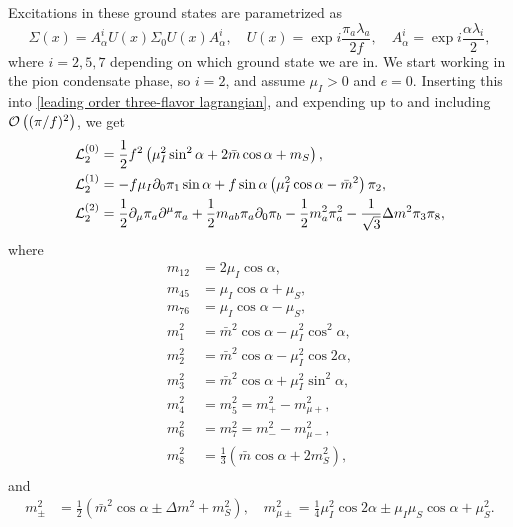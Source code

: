 Excitations in these ground states are parametrized as
%
\begin{equation}
    \Sigma(x) = A^i_\alpha U(x) \Sigma_0 U(x) A^i_\alpha, \quad
    U(x) = \exp{i \frac{\pi_a \lambda_a}{2 f}}, \quad
    A_\alpha^i = \exp{i \frac{\alpha \lambda_i}{2}},
\end{equation}
%
where $i = 2, 5, 7$ depending on which ground state we are in.
We start working in the pion condensate phase, so $i = 2$, and assume $\mu_I > 0$ and $e = 0$.
Inserting this into \autoref{leading order three-flavor lagrangian}, and expending up to and including $\mathcal O\left((\pi/f)^2\right)$, we get
%
\begin{align}
    \label{static three-flavor lagrangian}
    \mathcal{L}_2^{(0)} 
    &=
    \frac{1}{2} f^2
    \left(
        \mu_I^2 \sin^2\alpha
        + 2\bar m \cos\alpha
        + m_S
    \right), \\
    \label{linear three-flavor lagrangian}
    \mathcal{L}_2^{(1)}
    &=
    -f \mu_I \partial_0 \pi_1 \sin\alpha
    + f \sin\alpha
    \left(
        \mu_I^2\cos\alpha - \bar m^2
    \right)\pi_2, \\
    \label{quadratic three-flavor lagrangian}
    \mathcal{L}_2^{(2)} 
    &= 
    \frac{1}{2}\partial_\mu \pi_a \partial^\mu \pi_a
    + \frac{1}{2} m_{ab} \pi_a\partial_0\pi_b
    - \frac{1}{2} m_a^2 \pi_a^2
    - \frac{1}{\sqrt{3}} \Delta m^2 \pi_3 \pi_8,
\end{align}
%
where
%
\begingroup
\allowdisplaybreaks
\begin{align}
    m_{12} & = 2 \mu_I\cos\alpha,\\
    m_{45} & =\mu_I\cos\alpha + \mu_S, \\
    m_{76} & = \mu_I\cos\alpha - \mu_S, \\
    m_1^2 &=  \bar m^2\cos\alpha - \mu_I^2 \cos^2\alpha,\\
    m_2^2 &= \bar m^2\cos\alpha - \mu_I^2 \cos2\alpha, \\
    m_3^2 &= \bar m^2\cos\alpha + \mu_I^2 \sin^2\alpha, \\
    m_4^2 &= m_5^2 = m_+^2 - m_{\mu+}^2, \\
    m_6^2 &= m_7^2 = m_-^2 - m^2_{\mu-}, \\
    m_8^2 &= \frac{1}{3} (\bar m\cos\alpha + 2 m_S^2), \\
\end{align}
\endgroup
%
and
\begin{align}
    m_\pm^2 &= \frac{1}{2} (\bar m^2 \cos\alpha \pm \Delta m^2 + m_S^2),
    \quad
    m^2_{\mu\pm } = \frac{1}{4}\mu_I^2 \cos2\alpha \pm \mu_I\mu_S \cos\alpha + \mu_S^2.
\end{align}
